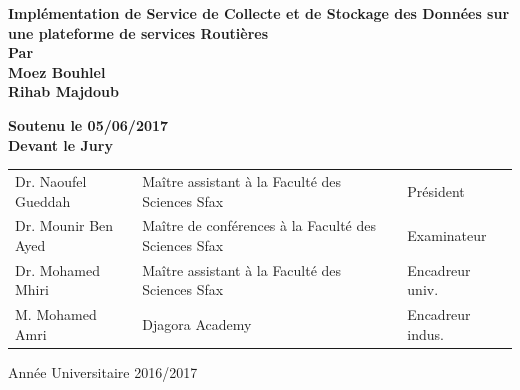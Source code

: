 \begin{titlepage}
    {\bfseries \Huge \color[RGB]{16,121,196}
        Implémentation de Service de Collecte et de Stockage des Données sur une plateforme de services Routières
    }\\[0.3in]

    {\bfseries \large Par} \\[0.25in]

    {\bfseries \LARGE \color[RGB]{255,90,90}
        Moez Bouhlel \\
        Rihab Majdoub
    }

    \vspace{0.4in}
    {\large \bfseries
        Soutenu le 05/06/2017 \\
        Devant le Jury
    }\\[0.3in]

    \normalsize
    \bfseries
    \setlength{\tabcolsep}{10pt}
    \begin{tabular}{l l l}
        Dr. Naoufel Gueddah & Maître assistant à la Faculté des Sciences Sfax & Président \\
        Dr. Mounir Ben Ayed & Maître de conférences à la Faculté des Sciences Sfax & Examinateur \\
        Dr. Mohamed Mhiri & Maître assistant à la Faculté des Sciences Sfax & Encadreur univ. \\
        M. Mohamed Amri & Djagora Academy & Encadreur indus.
    \end{tabular}

    \vfill
    Année Universitaire 2016/2017

\end{titlepage}
\restoregeometry
